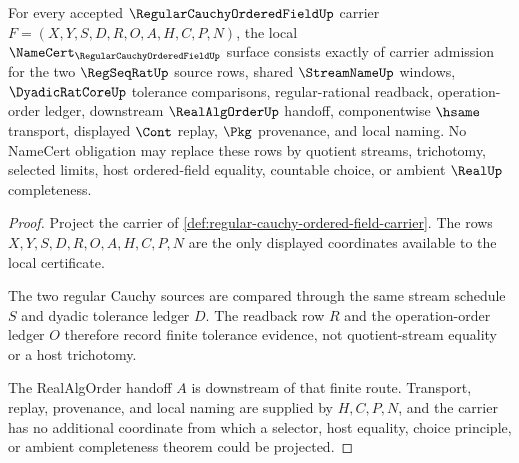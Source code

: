 \begin{theorem}
\label{thm:regular-cauchy-ordered-field-namecert-obligations}
For every accepted $\RegularCauchyOrderedFieldUp$ carrier $F=(X,Y,S,D,R,O,A,H,C,P,N)$, the local $\NameCert_{\RegularCauchyOrderedFieldUp}$ surface consists exactly of carrier admission for the two $\RegSeqRatUp$ source rows, shared $\StreamNameUp$ windows, $\DyadicRatCoreUp$ tolerance comparisons, regular-rational readback, operation-order ledger, downstream $\RealAlgOrderUp$ handoff, componentwise $\hsame$ transport, displayed $\Cont$ replay, $\Pkg$ provenance, and local naming. No NameCert obligation may replace these rows by quotient streams, trichotomy, selected limits, host ordered-field equality, countable choice, or ambient $\RealUp$ completeness.
\end{theorem}
\begin{proof}
Project the carrier of \autoref{def:regular-cauchy-ordered-field-carrier}. The rows $X,Y,S,D,R,O,A,H,C,P,N$ are the only displayed coordinates available to the local certificate.

The two regular Cauchy sources are compared through the same stream schedule $S$ and dyadic tolerance ledger $D$. The readback row $R$ and the operation-order ledger $O$ therefore record finite tolerance evidence, not quotient-stream equality or a host trichotomy.

The RealAlgOrder handoff $A$ is downstream of that finite route. Transport, replay, provenance, and local naming are supplied by $H,C,P,N$, and the carrier has no additional coordinate from which a selector, host equality, choice principle, or ambient completeness theorem could be projected.
\end{proof}

